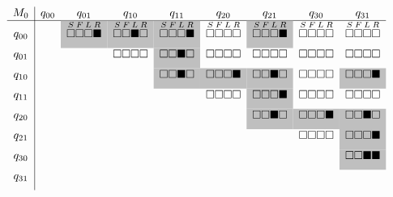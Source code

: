 \[
  \begin{array}{c|cccccccc}
    M_0 & q_{00} & q_{01} & q_{10} & q_{11} & q_{20} & q_{21} & q_{30} & q_{31} \\ \hline
    q_{00}       &        &
    \cellcolor{lightgray}{\overset{S}{\ws}\overset{F}{\ws}\overset{L}{\ws}\overset{R}{\bs}} &
    \cellcolor{lightgray}{\overset{S}{\ws}\overset{F}{\ws}\overset{L}{\bs}\overset{R}{\ws}} &
    \cellcolor{lightgray}{\overset{S}{\ws}\overset{F}{\ws}\overset{L}{\ws}\overset{R}{\bs}} &
    \overset{S}{\ws}\overset{F}{\ws}\overset{L}{\ws}\overset{R}{\ws} &
    \cellcolor{lightgray}{\overset{S}{\ws}\overset{F}{\ws}\overset{L}{\ws}\overset{R}{\bs}} &
    \overset{S}{\ws}\overset{F}{\ws}\overset{L}{\ws}\overset{R}{\ws} &
    \overset{S}{\ws}\overset{F}{\ws}\overset{L}{\ws}\overset{R}{\ws} \\ [6pt]
    q_{01}       &        &              & \ws\ws\ws\ws & \cellcolor{lightgray}{\ws\ws\bs\ws} & \ws\ws\ws\ws & \ws\ws\ws\ws & \ws\ws\ws\ws & \ws\ws\ws\ws \\ [6pt]
    q_{10}       &        &              &              & \cellcolor{lightgray}{\ws\ws\bs\ws} & \cellcolor{lightgray}{\ws\ws\ws\bs} & \cellcolor{lightgray}{\ws\ws\bs\ws} & \ws\ws\ws\ws & \cellcolor{lightgray}{\ws\ws\ws\bs} \\ [6pt]
    q_{11}       &        &              &              &              & \ws\ws\ws\ws & \cellcolor{lightgray}{\ws\ws\ws\bs} & \ws\ws\ws\ws & \ws\ws\ws\ws \\ [6pt]
    q_{20}       &        &              &              &              &              & \cellcolor{lightgray}{\ws\ws\bs\ws} & \cellcolor{lightgray}{\ws\ws\ws\bs} & \cellcolor{lightgray}{\ws\ws\bs\ws} \\ [6pt]
    q_{21}       &        &              &              &              &              &              & \ws\ws\ws\ws & \cellcolor{lightgray}{\ws\ws\ws\bs} \\ [6pt]
    q_{30}       &        &              &              &              &              &              &              & \cellcolor{lightgray}{\ws\ws\bs\bs} \\ [6pt]
    q_{31}       &        &              &              &              &              &              &              &              \\ [6pt]
  \end{array}
\]